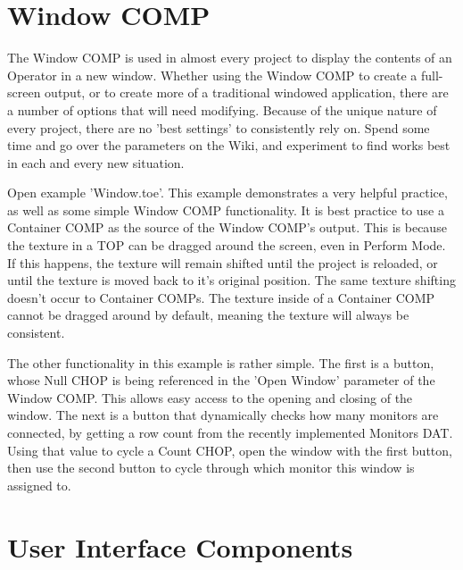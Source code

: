 
\section{Window COMP}

\begin{fullwidth}
The Window COMP is used in almost every project to display the contents of an Operator in a new window. Whether using the Window COMP to create a full-screen output, or to create more of a traditional windowed application, there are a number of options that will need modifying. Because of the unique nature of every project, there are no 'best settings' to consistently rely on. Spend some time and go over the parameters on the Wiki, and experiment to find works best in each and every new situation.

Open example 'Window.toe'. This example demonstrates a very helpful practice, as well as some simple Window COMP functionality. It is best practice to use a Container COMP as the source of the Window COMP's output. This is because the texture in a TOP can be dragged around the screen, even in Perform Mode. If this happens, the texture will remain shifted until the project is reloaded, or until the texture is moved back to it's original position. The same texture shifting doesn't occur to Container COMPs. The texture inside of a Container COMP cannot be dragged around by default, meaning the texture will always be consistent.

The other functionality in this example is rather simple. The first is a button, whose Null CHOP is being referenced in the 'Open Window' parameter of the Window COMP. This allows easy access to the opening and closing of the window. The next is a button that dynamically checks how many monitors are connected, by getting a row count from the recently implemented Monitors DAT. Using that value to cycle a Count CHOP, open the window with the first button, then use the second button to cycle through which monitor this window is assigned to.
\end{fullwidth}


\section{User Interface Components}

